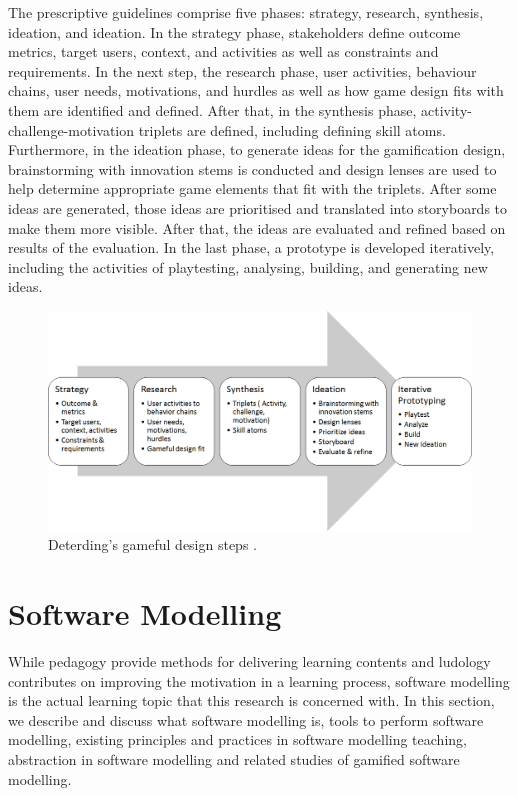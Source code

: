 \documentclass[12pt, a4paper]{report}
\begin{document}
The prescriptive guidelines comprise five phases: strategy, research, synthesis, ideation, and ideation. In the strategy phase, stakeholders define outcome metrics, target users, context, and activities as well as constraints and requirements. In the next step, the research phase, user activities, behaviour chains, user needs, motivations, and hurdles as well as how game design fits with them are identified and defined. After that, in the synthesis phase, activity-challenge-motivation triplets are defined, including defining skill atoms. Furthermore, in the ideation phase, to generate ideas for the gamification design, brainstorming with innovation stems is conducted and design lenses are used to help determine appropriate game elements that fit with the triplets. After some ideas are generated, those ideas are prioritised and translated into storyboards to make them more visible. After that, the ideas are evaluated and refined based on results of the evaluation. In the last phase, a prototype is developed iteratively, including the activities of playtesting, analysing, building, and generating new ideas. 

\begin{figure}[ht]
\centering
\includegraphics[width=12cm]{gameful-steps}
\caption{Deterding's gameful design steps \cite{deterding2015lens}.}
\label{fig:gameful-steps}
\end{figure}


\section{Software Modelling}
While pedagogy provide methods for delivering learning contents and ludology contributes on improving the motivation in a learning process, software modelling is the actual learning topic that this research is concerned with. In this section, we describe and discuss what software modelling is, tools to perform software modelling, existing principles and practices in software modelling teaching, abstraction in software modelling and related studies of gamified software modelling.    
\end{document}
